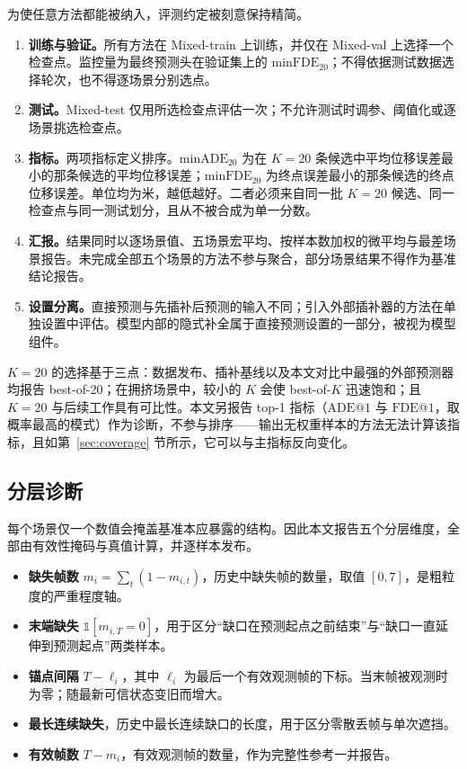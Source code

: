 为使任意方法都能被纳入，评测约定被刻意保持精简。
\begin{enumerate}
\item \textbf{训练与验证。}所有方法在 Mixed-train 上训练，并仅在 Mixed-val 上选择一个检查点。监控量为最终预测头在验证集上的 $\mathrm{minFDE}_{20}$；不得依据测试数据选择轮次，也不得逐场景分别选点。
\item \textbf{测试。}Mixed-test 仅用所选检查点评估一次；不允许测试时调参、阈值化或逐场景挑选检查点。
\item \textbf{指标。}两项指标定义排序。$\mathrm{minADE}_{20}$ 为在 $K=20$ 条候选中平均位移误差最小的那条候选的平均位移误差；$\mathrm{minFDE}_{20}$ 为终点误差最小的那条候选的终点位移误差。单位均为米，越低越好。二者必须来自同一批 $K=20$ 候选、同一检查点与同一测试划分，且从不被合成为单一分数。
\item \textbf{汇报。}结果同时以逐场景值、五场景宏平均、按样本数加权的微平均与最差场景报告。未完成全部五个场景的方法不参与聚合，部分场景结果不得作为基准结论报告。
\item \textbf{设置分离。}直接预测与先插补后预测的输入不同；引入外部插补器的方法在单独设置中评估。模型内部的隐式补全属于直接预测设置的一部分，被视为模型组件。
\end{enumerate}

$K=20$ 的选择基于三点：数据发布、插补基线以及本文对比中最强的外部预测器均报告 best-of-20；在拥挤场景中，较小的 $K$ 会使 best-of-$K$ 迅速饱和；且 $K=20$ 与后续工作具有可比性。本文另报告 top-1 指标（$\mathrm{ADE@1}$ 与 $\mathrm{FDE@1}$，取概率最高的模式）作为诊断，不参与排序——输出无权重样本的方法无法计算该指标，且如第~\ref{sec:coverage} 节所示，它可以与主指标反向变化。

\subsection{分层诊断}
\label{sec:diagnostics}

每个场景仅一个数值会掩盖基准本应暴露的结构。因此本文报告五个分层维度，全部由有效性掩码与真值计算，并逐样本发布。
\begin{itemize}
\item \textbf{缺失帧数} $m_{i}=\sum_{t}(1-m_{i,t})$，历史中缺失帧的数量，取值 $[0,7]$，是粗粒度的严重程度轴。
\item \textbf{末端缺失} $\mathbb{1}[m_{i,T}=0]$，用于区分“缺口在预测起点之前结束”与“缺口一直延伸到预测起点”两类样本。
\item \textbf{锚点间隔} $T-\ell_{i}$，其中 $\ell_{i}$ 为最后一个有效观测帧的下标。当末帧被观测时为零；随最新可信状态变旧而增大。
\item \textbf{最长连续缺失}，历史中最长连续缺口的长度，用于区分零散丢帧与单次遮挡。
\item \textbf{有效帧数} $T-m_{i}$，有效观测帧的数量，作为完整性参考一并报告。
\end{itemize}

